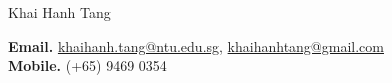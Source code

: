 \documentclass[a4paper, 11pt]{article}
\begin{document}
	
	
	\pagestyle{empty} %
	\par{\centering
		{\Huge Khai Hanh Tang
		}\bigskip\par}
	
	
	\textbf{Email.} \url{khaihanh.tang@ntu.edu.sg}, \url{khaihanhtang@gmail.com}\\
	\textbf{Mobile.} (+65) 9469 0354
	\begin{comment}
		\section{Personal Information}
		
		\begin{tabular}{rl}
			\textsc{Placeof Birth:} & Sadec City, Dong Thap Province, Vietnam \\
			\textsc{Date of Birth:} & September 16\textsuperscript{th} 1995 \\
			\textsc{Address:}   & University of Science, VNU-HCM\\
			& 227 Nguyen Van Cu, Ward 1, District 5, Ho Chi Minh city, Vietnam \\
			\textsc{Phone:}     & (+84) 905 718 507\\
			\textsc{email:}     &  \href{mailto:tang0404@e.ntu.edu.sg}{tang0404@e.ntu.edu.sg}
		\end{tabular}
	\end{comment}
\end{document}
